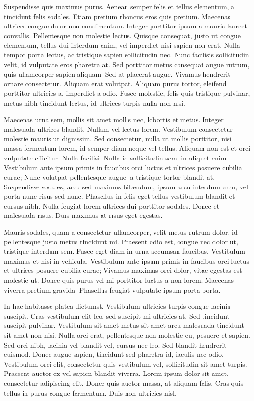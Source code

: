 \documentclass{article}
\begin{document}
Suspendisse quis maximus purus. Aenean semper felis et tellus elementum, a tincidunt felis sodales. Etiam pretium rhoncus eros quis pretium. Maecenas ultrices congue dolor non condimentum. Integer porttitor ipsum a mauris laoreet convallis. Pellentesque non molestie lectus. Quisque consequat, justo ut congue elementum, tellus dui interdum enim, vel imperdiet nisi sapien non erat. Nulla tempor porta lectus, ac tristique sapien sollicitudin nec. Nunc facilisis sollicitudin velit, id vulputate eros pharetra at. Sed porttitor metus consequat augue rutrum, quis ullamcorper sapien aliquam. Sed at placerat augue. Vivamus hendrerit ornare consectetur. Aliquam erat volutpat. Aliquam purus tortor, eleifend porttitor ultricies a, imperdiet a odio. Fusce molestie, felis quis tristique pulvinar, metus nibh tincidunt lectus, id ultrices turpis nulla non nisi.

Maecenas urna sem, mollis sit amet mollis nec, lobortis et metus. Integer malesuada ultrices blandit. Nullam vel lectus lorem. Vestibulum consectetur molestie mauris ut dignissim. Sed consectetur, nulla ut mollis porttitor, nisi massa fermentum lorem, id semper diam neque vel tellus. Aliquam non est et orci vulputate efficitur. Nulla facilisi. Nulla id sollicitudin sem, in aliquet enim. Vestibulum ante ipsum primis in faucibus orci luctus et ultrices posuere cubilia curae; Nunc volutpat pellentesque augue, a tristique tortor blandit at. Suspendisse sodales, arcu sed maximus bibendum, ipsum arcu interdum arcu, vel porta nunc risus sed nunc. Phasellus in felis eget tellus vestibulum blandit et cursus nibh. Nulla feugiat lorem ultrices dui porttitor sodales. Donec et malesuada risus. Duis maximus at risus eget egestas.

Mauris sodales, quam a consectetur ullamcorper, velit metus rutrum dolor, id pellentesque justo metus tincidunt mi. Praesent odio est, congue nec dolor ut, tristique interdum sem. Fusce eget diam in urna accumsan faucibus. Vestibulum maximus et nisi in vehicula. Vestibulum ante ipsum primis in faucibus orci luctus et ultrices posuere cubilia curae; Vivamus maximus orci dolor, vitae egestas est molestie ut. Donec quis purus vel mi porttitor luctus a non lorem. Maecenas viverra pretium gravida. Phasellus feugiat vulputate ipsum porta porta.

In hac habitasse platea dictumst. Vestibulum ultricies turpis congue lacinia suscipit. Cras vestibulum elit leo, sed suscipit mi ultricies at. Sed tincidunt suscipit pulvinar. Vestibulum sit amet metus sit amet arcu malesuada tincidunt sit amet non nisi. Nulla orci erat, pellentesque non molestie eu, posuere et sapien. Sed orci nibh, lacinia vel blandit vel, cursus nec leo. Sed blandit hendrerit euismod. Donec augue sapien, tincidunt sed pharetra id, iaculis nec odio. Vestibulum orci elit, consectetur quis vestibulum vel, sollicitudin sit amet turpis. Praesent auctor ex vel sapien blandit viverra. Lorem ipsum dolor sit amet, consectetur adipiscing elit. Donec quis auctor massa, at aliquam felis. Cras quis tellus in purus congue fermentum. Duis non ultricies nisl.
\end{document}
